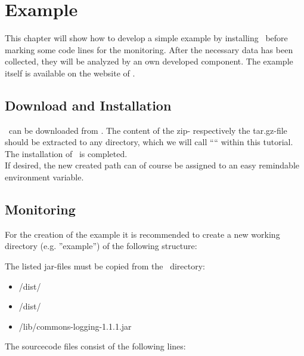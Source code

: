\chapter{Example}
    This chapter will show how to develop a simple example by installing \Kieker\ before marking some code lines for the monitoring. After the necessary data has been collected, they will be analyzed by an own developed component. The example itself is available on the website of \Kieker.
	
	\section{Download and Installation}
      \Kieker\ can be downloaded from \KiekerDownloadUrl. The content of the zip- respectively the tar.gz-file should be extracted to any directory, which we will call ``\KiekerDir`` within this tutorial. The installation of \Kieker\ is completed.\\
      If desired, the new created path can of course be assigned to an easy remindable environment variable. 
 
    \section{Monitoring}
      For the creation of the example it is recommended to create a new working directory (e.g. ''example'') of the following structure:
      \begin{center}
      \end{center}
	  The listed jar-files must be copied from the \Kieker\ directory:
      \begin{itemize}
		\item \KiekerDir/dist/\commonJar\
		\item \KiekerDir/dist/\monitoringCtrlJar\
		\item \KiekerDir/lib/commons-logging-1.1.1.jar
      \end{itemize}
      The sourcecode files consist of the following lines:
      \setJavaCodeListing

